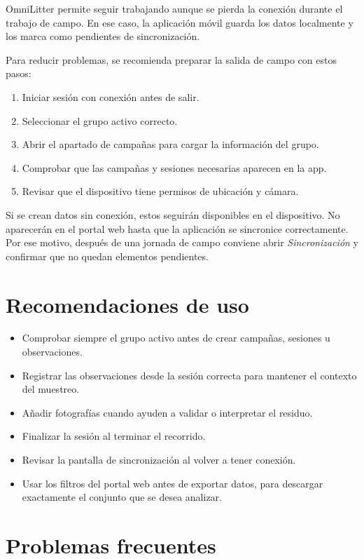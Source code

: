 OmniLitter permite seguir trabajando aunque se pierda la conexión durante el trabajo
de campo. En ese caso, la aplicación móvil guarda los datos localmente y los marca
como pendientes de sincronización.

Para reducir problemas, se recomienda preparar la salida de campo con estos pasos:

\begin{enumerate}[leftmargin=1.5em]
  \item Iniciar sesión con conexión antes de salir.
  \item Seleccionar el grupo activo correcto.
  \item Abrir el apartado de campañas para cargar la información del grupo.
  \item Comprobar que las campañas y sesiones necesarias aparecen en la app.
  \item Revisar que el dispositivo tiene permisos de ubicación y cámara.
\end{enumerate}

Si se crean datos sin conexión, estos seguirán disponibles en el dispositivo. No
aparecerán en el portal web hasta que la aplicación se sincronice correctamente. Por
ese motivo, después de una jornada de campo conviene abrir \textit{Sincronización} y
confirmar que no quedan elementos pendientes.

\section{Recomendaciones de uso}

\begin{itemize}[leftmargin=1.5em]
  \item Comprobar siempre el grupo activo antes de crear campañas, sesiones u
  observaciones.
  \item Registrar las observaciones desde la sesión correcta para mantener el
  contexto del muestreo.
  \item Añadir fotografías cuando ayuden a validar o interpretar el residuo.
  \item Finalizar la sesión al terminar el recorrido.
  \item Revisar la pantalla de sincronización al volver a tener conexión.
  \item Usar los filtros del portal web antes de exportar datos, para descargar
  exactamente el conjunto que se desea analizar.
\end{itemize}

\section{Problemas frecuentes}

